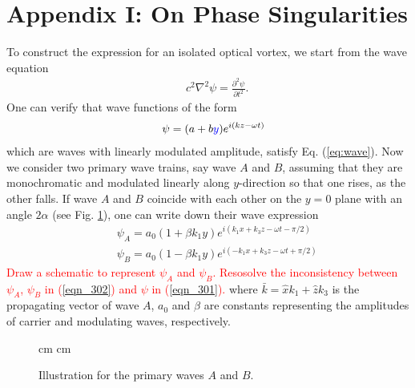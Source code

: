 \section*{Appendix I: On Phase Singularities}

To construct the expression for an isolated optical vortex, we start from the wave equation
\begin{eqnarray}
	&&c^2\nabla^2\psi = \frac{\partial^2 \psi}{\partial t^2}.
	\label{eq:wave}
\end{eqnarray}
One can verify that wave functions of the form
\begin{eqnarray}
	&&\psi = (a + b\textcolor{blue}{y}) e^{i(kz - \omega t)}
	\label{eqn_301}
\end{eqnarray}
which are waves with linearly modulated amplitude, satisfy Eq. (\ref{eq:wave}). 
Now we consider two primary wave trains, say wave $A$ and $B$, assuming that they are monochromatic and modulated linearly along $y$-direction so that one rises, as the other falls. 
If wave $A$ and $B$ coincide with each other on the $y = 0$ plane with an angle $2 \alpha$ (see Fig. \ref{fig:two_primary_waves}), one can write down their wave expression
\begin{eqnarray}
	&&\psi_A = a_0(1 + \beta k_1 y) e^{i(k_1 x + k_3 z - \omega t - \pi/2)}
	\nonumber \\
	&&\psi_B = a_0(1 - \beta k_1 y) e^{i(-k_1 x + k_3 z - \omega t + \pi/2)}
	\label{eqn_302}
\end{eqnarray}
\textcolor{red}{Draw a schematic to represent $\psi_A$ and $\psi_B$.
	Resosolve the inconsistency between $\psi_A$, $\psi_B$ in (\ref{eqn_302}) and $\psi$ in (\ref{eqn_301}).}
where $\bar{k} = \hat{x} k_1 + \hat{z} k_3$ is the propagating vector of wave $A$, 
$a_0$ and $\beta$ are constants representing the amplitudes of carrier and modulating waves, respectively.

\begin{figure}[h]
	 cm
	 cm
	\caption{Illustration for the primary waves $A$ and $B$.}
	\label{fig:two_primary_waves}
\end{figure}

